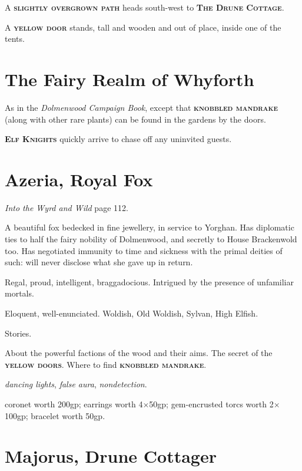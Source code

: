\documentclass[10pt]{article}
\newcommand\locationcolour{Mahogany}
\newcommand\npccolour{CornflowerBlue}
\newcommand\headingcolour{\locationcolour}
\newcommand{\keyword}[1]{\textsc{\textbf{#1}}}
\newcommand{\location}[1]{\keyword{\color{\locationcolour}#1}}
\begin{document}
\begin{multicols*}{2}
A \keyword{slightly overgrown path} heads south-west to \location{The
  Drune Cottage}.

A \keyword{yellow door} stands, tall and wooden and out of place,
inside one of the tents.

\section*{The Fairy Realm of Whyforth}

As in the \emph{Dolmenwood Campaign Book}, except that
\keyword{knobbled mandrake} (along with other rare plants) can be
found in the gardens by the doors.

\keyword{Elf Knights} quickly arrive to chase off any uninvited
guests.

\renewcommand\headingcolour{\npccolour}

\section*{Azeria, Royal Fox}

\emph{Into the Wyrd and Wild} page 112.

A beautiful fox bedecked in fine jewellery, in service to Yorghan.
Has diplomatic ties to half the fairy nobility of Dolmenwood, and
secretly to House Brackenwold too.  Has negotiated immunity to time
and sickness with the primal deities of such: will never disclose what
she gave up in return.

\begin{description}[leftmargin=!,labelwidth=\widthof{\bfseries Demeanour}]
\item[Demeanour] Regal, proud, intelligent, braggadocious.  Intrigued
  by the presence of unfamiliar mortals.
\item[Speech] Eloquent, well-enunciated.  Woldish, Old Woldish,
  Sylvan, High Elfish.
\item[Wants] Stories.
\item[Knows] About the powerful factions of the wood and their aims.
  The secret of the \keyword{yellow doors}.  Where to find
  \keyword{knobbled mandrake}.
\item[Spells] \emph{dancing lights}, \emph{false aura},
  \emph{nondetection}.
\item[Treasure] coronet worth 200gp; earrings worth 4$\times$50gp;
  gem-encrusted torcs worth 2$\times$100gp; bracelet worth 50gp.
\end{description}

\section*{Majorus, Drune Cottager}


\end{multicols*}
\end{document}
